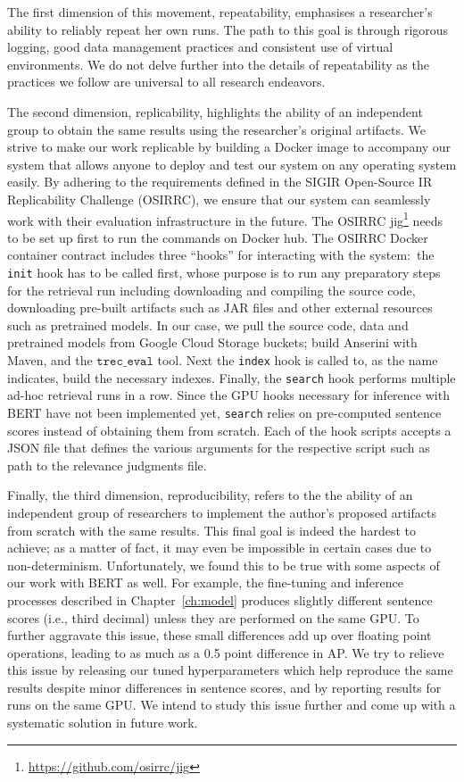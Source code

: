 \newpage

The first dimension of this movement, repeatability, emphasises a researcher's ability to reliably repeat her own runs.
The path to this goal is through rigorous logging, good data management practices and consistent use of virtual environments.
We do not delve further into the details of repeatability as the practices we follow are universal to all research endeavors.

The second dimension, replicability, highlights the ability of an independent group to obtain the same results using the researcher's original artifacts.
We strive to make our work replicable by building a Docker image to accompany our system that allows anyone to deploy and test our system on any operating system easily.
By adhering to the requirements defined in the SIGIR Open-Source IR Replicability Challenge (OSIRRC), we ensure that our system can seamlessly work with their evaluation infrastructure in the future.
The OSIRRC jig\footnote{\url{https://github.com/osirrc/jig}} needs to be set up first to run the commands on Docker hub.
The OSIRRC Docker container contract includes three ``hooks'' for interacting with the system:\
the \texttt{init} hook has to be called first, whose purpose is to run any preparatory steps for the retrieval run including downloading and compiling the source code, downloading pre-built artifacts such as JAR files and other external resources such as pretrained models.
In our case, we pull the source code, data and pretrained models from Google Cloud Storage buckets; build Anserini with Maven, and the $\texttt{trec\_eval}$ tool.
Next the \texttt{index} hook is called to, as the name indicates, build the necessary indexes.
Finally, the \texttt{search} hook performs multiple ad-hoc retrieval runs in a row.
Since the GPU hooks necessary for inference with BERT have not been implemented yet, \texttt{search} relies on pre-computed sentence scores instead of obtaining them from scratch.
Each of the hook scripts accepts a JSON file that defines the various arguments for the respective script such as path to the relevance judgments file.

Finally, the third dimension, reproducibility, refers to the the ability of an independent group of researchers to implement the author's proposed artifacts from scratch with the same results.
This final goal is indeed the hardest to achieve; as a matter of fact, it may even be impossible in certain cases due to non-determinism.
Unfortunately, we found this to be true with some aspects of our work with BERT as well.
For example, the fine-tuning and inference processes described in Chapter~\ref{ch:model} produces slightly different sentence scores (i.e., third decimal) unless they are performed on the same GPU.
To further aggravate this issue, these small differences add up over floating point operations, leading to as much as a 0.5 point difference in AP.
We try to relieve this issue by releasing our tuned hyperparameters which help reproduce the same results despite minor differences in sentence scores, and by reporting results for runs on the same GPU.
We intend to study this issue further and come up with a systematic solution in future work.

